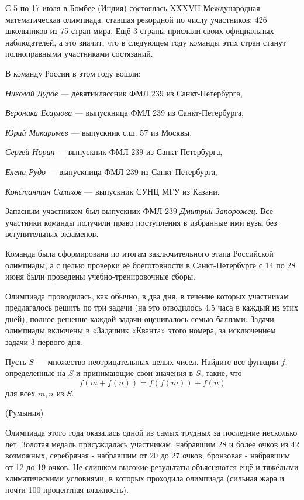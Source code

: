 \documentclass[a4paper,9pt]{article}
\begin{document}
\begin{multicols}{3}

С 5 по 17 июля в Бомбее (Индия) состоялась XXXVII Международная математическая олимпиада, ставшая рекордной по числу участников: 426 школьников из 75 стран мира. Ещё 3 страны прислали своих официальных наблюдателей, а это значит, что в следующем году команды этих стран станут полноправными участниками состязаний.

В команду России в этом году вошли:

\textit{Николай Дуров} — девятиклассник ФМЛ 239 из Санкт-Петербурга, 

\textit{Вероника Есаулова} — выпускница ФМЛ 239 из Санкт-Петербурга, 

\textit{Юрий Макарычев} — выпускник с.ш. 57 из Москвы,  

\textit{Сергей Норин} — выпускник ФМЛ 239 из Санкт-Петербурга,  

\textit{Елена Рудо} — выпускница ФМЛ 239 из Санкт-Петербурга,  

\textit{Константин Салихов} — выпускник СУНЦ МГУ из Казани.

Запасным участником был выпускник ФМЛ 239 \textit{Дмитрий Запорожец}. Все участники команды получили право поступления в избранные ими вузы без вступительных экзаменов.

Команда была сформирована по итогам заключительного этапа Российской олимпиады, а с целью проверки её боеготовности в Санкт-Петербурге с 14 по 28 июня были проведены учебно-тренировочные сборы.


Олимпиада проводилась, как обычно, в два дня, в течение которых участникам предлагалось решить по три задачи (на это отводилось 4,5 часа в каждый из этих дней), полное решение каждой задачи оценивалось семью баллами. Задачи олимпиады включены в «Задачник «Кванта» этого номера, за исключением задачи 3 первого дня.
  
Пусть \(S\) — множество неотрицательных целых чисел. Найдите все функции \(f\), определенные на \(S\) и принимающие свои значения в \(S\), такие, что\[f(m + f(n)) = f(f(m)) + f(n)\]
для всех \(m, n\) из \(S\).

\hfill (Румыния)

Олимпиада этого года оказалась одной из самых трудных за последние несколько лет. Золотая медаль присуждалась участникам, набравшим 28 и более очков из 42 возможных, серебряная - набравшим от 20 до 27 очков, бронзовая - набравшим от 12 до 19 очков. Не слишком высокие результаты объясняются ещё и тяжёлыми климатическими условиями, в которых проходила олимпиада (сильная жара и почти 100-процентная влажность).


\end{multicols}
\end{document}

